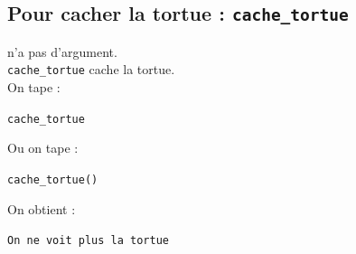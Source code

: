 \documentclass[a4paper,11pt]{book}
\begin{document}
\subsection{Pour cacher la tortue : {\tt cache\_tortue}}
 n'a pas d'argument.\\
{\tt cache\_tortue} cache la tortue.\\
On tape :
\begin{center}{\tt cache\_tortue}\end{center}
Ou on tape :
\begin{center}{\tt cache\_tortue()}\end{center}
On obtient :
\begin{center}{\tt On ne voit plus la tortue}\end{center}
\end{document}
